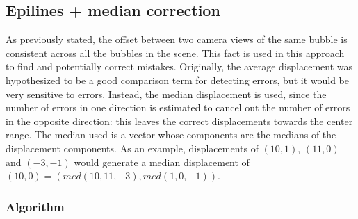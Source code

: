 \subsection{Epilines + median correction}
\label{sec:match:epi-median}

As previously stated, the offset between two camera views of the same bubble is consistent across all the bubbles in the scene.
This fact is used in this approach to find and potentially correct mistakes.
Originally, the average displacement was hypothesized to be a good comparison term for detecting errors, but it would be very sensitive to errors.
Instead, the median displacement is used, since the number of errors in one direction is estimated to cancel out the number of errors in the opposite direction: this leaves the correct displacements towards the center range.
The median used is a vector whose components are the medians of the displacement components.
As an example, displacements of $(10, 1)$, $(11, 0)$ and $(-3, -1)$ would generate a median displacement of $(10, 0) = \left( med(10, 11, -3), med(1, 0, -1) \right)$.


\subsubsection{Algorithm}

